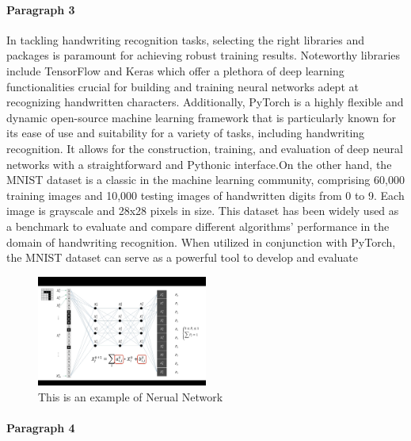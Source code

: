 \documentclass[12pt]{article}
\begin{document}
\paragraph{Paragraph 3}
In tackling handwriting recognition tasks, selecting the right libraries and packages is paramount for achieving robust training results. Noteworthy libraries include TensorFlow and Keras which offer a plethora of deep learning functionalities crucial for building and training neural networks adept at recognizing handwritten characters. Additionally, PyTorch is a highly flexible and dynamic open-source machine learning framework that is particularly known for its ease of use and suitability for a variety of tasks, including handwriting recognition. It allows for the construction, training, and evaluation of deep neural networks with a straightforward and Pythonic interface.On the other hand, the MNIST dataset is a classic in the machine learning community, comprising 60,000 training images and 10,000 testing images of handwritten digits from 0 to 9. Each image is grayscale and 28x28 pixels in size. This dataset has been widely used as a benchmark to evaluate and compare different algorithms' performance in the domain of handwriting recognition. When utilized in conjunction with PyTorch, the MNIST dataset can serve as a powerful tool to develop and evaluate \begin{figure}
    \centering
    \includegraphics[width=0.5\textwidth]{Image1.png}
    \vspace{0.5cm}
    \caption{This is an example of Nerual Network}
    \label{fig:my_image_label}
\end{figure}


\paragraph{Paragraph 4}




\cite{824821}
\cite{NIPS2008_66368270}
\cite{6981034}
\end{document}
